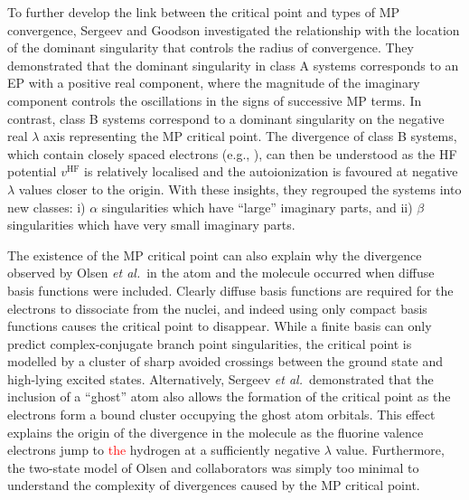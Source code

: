 \documentclass[aps,prb,reprint,noshowkeys,superscriptaddress]{revtex4-1}
\newcommand{\titou}[1]{\textcolor{red}{#1}}
\newcommand{\latin}[1]{#1}
\newcommand{\eg}{\latin{e.g.}}
\newcommand{\etal}{\textit{et al.}}
\begin{document}
To further develop the link between the critical point and types of MP convergence, Sergeev and Goodson investigated
the relationship with the location of the dominant singularity that controls the radius of convergence.\cite{Goodson_2004}
They demonstrated that the dominant singularity in class A systems corresponds to an EP with a positive real component, 
where the magnitude of the imaginary component controls the oscillations in the signs of successive MP 
terms.\cite{Goodson_2000a,Goodson_2000b}
In contrast, class B systems correspond to a dominant singularity on the negative real $\lambda$ axis representing
the MP critical point.
The divergence of class B systems, which contain closely spaced electrons (\eg, ), can then be understood as the 
HF potential $v^{\text{HF}}$ is relatively localised and the autoionization is favoured at negative 
$\lambda$ values closer to the origin.
With these insights, they regrouped the systems into new classes: i) $\alpha$ singularities which have ``large'' imaginary parts, 
and ii) $\beta$ singularities which have very small imaginary parts.\cite{Goodson_2004,Sergeev_2006} 

The existence of the MP critical point can also explain why the divergence observed by Olsen \etal\ in the  atom 
and the  molecule occurred when diffuse basis functions were included.\cite{Olsen_1996}
Clearly diffuse basis functions are required for the electrons to dissociate from the nuclei, and indeed using
only compact basis functions causes the critical point to disappear.
While a finite basis can only predict complex-conjugate branch point singularities, the critical point is modelled
by a cluster of sharp avoided crossings between the ground state and high-lying excited states.\cite{Sergeev_2005}
Alternatively, Sergeev \etal\ demonstrated that the inclusion of a ``ghost'' atom also
allows the formation of the critical point as the electrons form a bound cluster occupying the ghost atom orbitals.\cite{Sergeev_2005}
This effect explains the origin of the divergence in the  molecule as the fluorine valence electrons jump to \titou{the} hydrogen at
 a sufficiently negative $\lambda$ value.\cite{Sergeev_2005}
Furthermore, the two-state model of Olsen and collaborators \cite{Olsen_2000} was simply too minimal to understand the complexity of 
divergences caused by the MP critical point.
\end{document}
